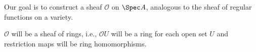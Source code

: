 Our goal is to construct a sheaf $\mathcal{O}$ on $\Spec A$, analogous to the sheaf of
regular functions on a variety.

$\mathcal{O}$ will be a sheaf of rings, i.e., $\mathcal{O}U$ will be a ring for each
open set $U$ and restriction maps will be ring homomorphisms.
